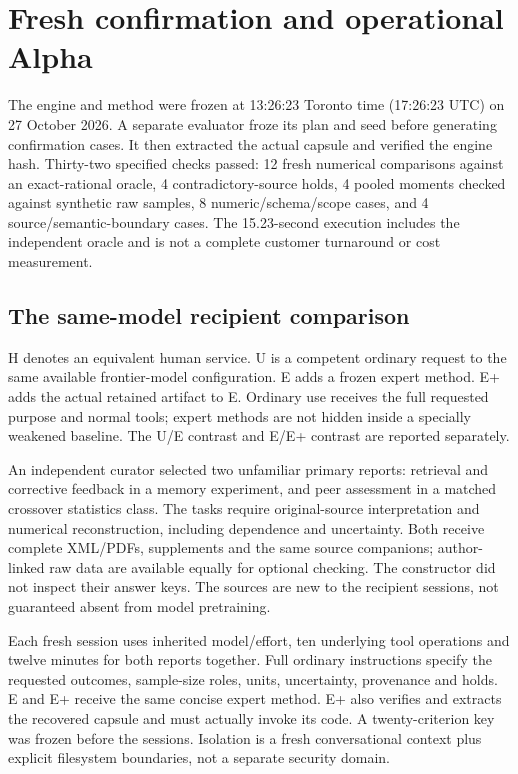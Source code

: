 \section{Fresh confirmation and operational Alpha}

The engine and method were frozen at 13:26:23 Toronto time (17:26:23 UTC) on 27 October 2026. A separate evaluator froze its plan and seed before generating confirmation cases. It then extracted the actual capsule and verified the engine hash. Thirty-two specified checks passed: 12 fresh numerical comparisons against an exact-rational oracle, 4 contradictory-source holds, 4 pooled moments checked against synthetic raw samples, 8 numeric/schema/scope cases, and 4 source/semantic-boundary cases. The 15.23-second execution includes the independent oracle and is not a complete customer turnaround or cost measurement.

\subsection{The same-model recipient comparison}

H denotes an equivalent human service. U is a competent ordinary request to the same available frontier-model configuration. E adds a frozen expert method. E+ adds the actual retained artifact to E. Ordinary use receives the full requested purpose and normal tools; expert methods are not hidden inside a specially weakened baseline. The U/E contrast and E/E+ contrast are reported separately.

An independent curator selected two unfamiliar primary reports: retrieval and corrective feedback in a memory experiment, and peer assessment in a matched crossover statistics class. The tasks require original-source interpretation and numerical reconstruction, including dependence and uncertainty. Both receive complete XML/PDFs, supplements and the same source companions; author-linked raw data are available equally for optional checking. The constructor did not inspect their answer keys. The sources are new to the recipient sessions, not guaranteed absent from model pretraining.\citep{maraver,sun}

Each fresh session uses inherited model/effort, ten underlying tool operations and twelve minutes for both reports together. Full ordinary instructions specify the requested outcomes, sample-size roles, units, uncertainty, provenance and holds. E and E+ receive the same concise expert method. E+ also verifies and extracts the recovered capsule and must actually invoke its code. A twenty-criterion key was frozen before the sessions. Isolation is a fresh conversational context plus explicit filesystem boundaries, not a separate security domain.

